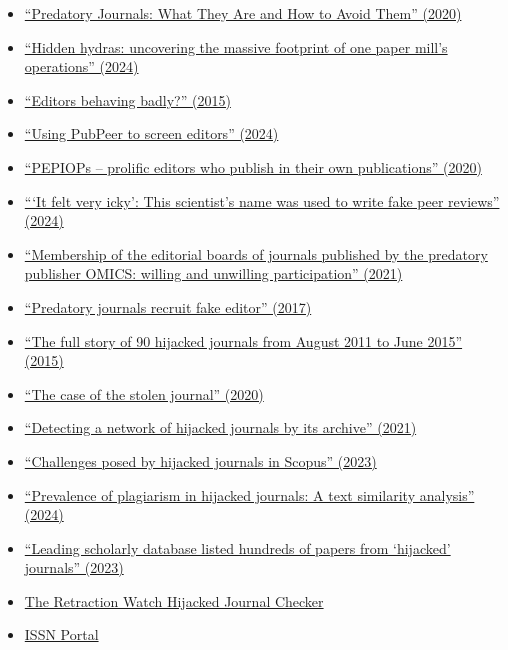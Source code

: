\documentclass[letterpaper, 12pt]{article}
\begin{document}
\begin{itemize}
    \setlength\itemsep{-0.5em}
    \item \href{https://doi.org/10.1177/0192623320920209}{``Predatory Journals: What They Are and How to Avoid Them'' (2020)}
    \item \href{https://retractionwatch.com/2024/10/01/hidden-hydras-uncovering-the-massive-footprint-of-one-paper-mills-operations/}{``Hidden hydras: uncovering the massive footprint of one paper mill’s operations'' (2024)}
    \item \href{https://deevybee.blogspot.com/2015/02/editors-behaving-badly.html}{``Editors behaving badly?'' (2015)}
    \item \href{https://deevybee.blogspot.com/2024/09/using-pubpeer-to-screen-editors.html}{``Using PubPeer to screen editors'' (2024)}
    \item \href{https://deevybee.blogspot.com/2020/08/pepiops-prolific-editors-who-publish-in.html}{``PEPIOPs – prolific editors who publish in their own publications'' (2020)}
    \item \href{https://www.science.org/content/article/it-felt-very-icky-scientist-s-name-was-used-write-fake-peer-reviews}{```It felt very icky': This scientist's name was used to write fake peer reviews'' (2024)}
    \item \href{https://doi.org/10.47989/irpaper912}{``Membership of the editorial boards of journals published by the predatory publisher OMICS: willing and unwilling participation'' (2021)}
    \item \href{https://doi.org/10.1038/543481a}{``Predatory journals recruit fake editor'' (2017)}
    \item \href{https://doi.org/10.18421/GP19.02-06}{``The full story of 90 hijacked journals from August 2011 to June 2015'' (2015)}
    \item \href{https://retractionwatch.com/2020/07/07/the-case-of-the-stolen-journal/}{``The case of the stolen journal'' (2020)}
    \item \href{https://doi.org/10.1007/s11192-021-04056-0}{``Detecting a network of hijacked journals by its archive'' (2021)}
    \item \href{https://doi.org/10.1002/asi.24855}{``Challenges posed by hijacked journals in Scopus'' (2023)}
    \item \href{https://doi.org/10.1080/08989621.2024.2387210}{``Prevalence of plagiarism in hijacked journals: A text similarity analysis'' (2024)}
    \item \href{https://doi.org/10.1126/science.zcgp0a2}{``Leading scholarly database listed hundreds of papers from ‘hijacked’ journals'' (2023)}
    \item \href{https://retractionwatch.com/the-retraction-watch-hijacked-journal-checker/}{The Retraction Watch Hijacked Journal Checker}
    \item \href{https://portal.issn.org/}{ISSN Portal}
\end{itemize}
\end{document}
